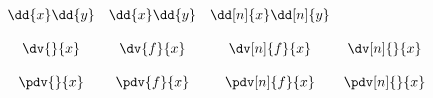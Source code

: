 \documentclass{unittest}
\begin{document}
\(\begin{array}{ccccc}
\\\\%
	\dd{x}\dd{y} & \dd{x}\dd{y} &\dd[n]{x}\dd[n]{y}
\\\\%
	\dv{}{x} & \dv{f}{x} & \dv[n]{f}{x} & \dv[n]{}{x}
\\\\%
	\pdv{}{x} & \pdv{f}{x} & \pdv[n]{f}{x} & \pdv[n]{}{x}
\\\\%
\end{array}\)
\end{document}
